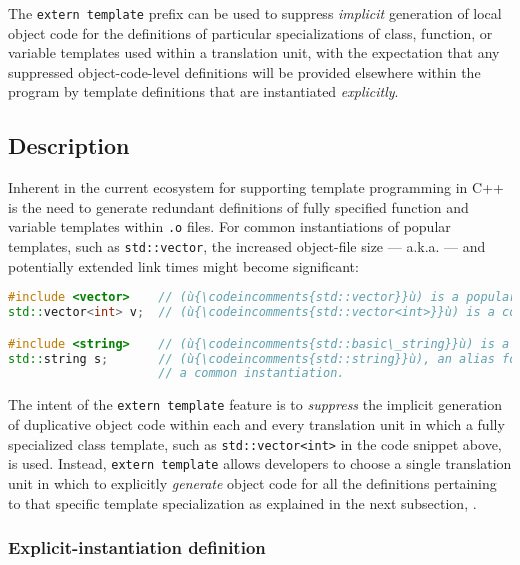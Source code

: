 


The \lstinline!extern!~\lstinline!template! prefix can be used to suppress
\emph{implicit} generation of local object code for the definitions of
particular specializations of class, function, or
variable templates used within a translation unit, with the
expectation that any suppressed object-code-level definitions will be
provided elsewhere within the program by template definitions that are
instantiated \emph{explicitly}.

\subsection[Description]{Description}\label{description}

Inherent in the current ecosystem for supporting template programming in
C++ is the need to generate redundant definitions of fully specified
function and variable templates within \lstinline!.o! files. For common
instantiations of popular templates, such as \lstinline!std::vector!, the
increased object-file size --- a.k.a.  --- and
potentially extended link times might become significant:

\begin{lstlisting}[language=C++]
#include <vector>    // (ù{\codeincomments{std::vector}}ù) is a popular template.
std::vector<int> v;  // (ù{\codeincomments{std::vector<int>}}ù) is a common instantiation.

#include <string>    // (ù{\codeincomments{std::basic\_string}}ù) is a popular template.
std::string s;       // (ù{\codeincomments{std::string}}ù), an alias for (ù{\codeincomments{std::basic\_string<char>}}ù), is
                     // a common instantiation.
\end{lstlisting}
    
\noindent The intent of the \lstinline!extern!~\lstinline!template! feature is to
\emph{suppress} the implicit generation of duplicative object code
within each and every translation unit in which a fully specialized
class template, such as \lstinline!std::vector<int>! in the code snippet
above, is used. Instead, \lstinline!extern!~\lstinline!template! allows
developers to choose a single translation unit in which to explicitly
\emph{generate} object code for all the definitions pertaining to that
specific template specialization as explained in the next
subsection, .

\subsubsection[Explicit-instantiation definition]{Explicit-instantiation definition}\label{explicit-instantiation-definition}


